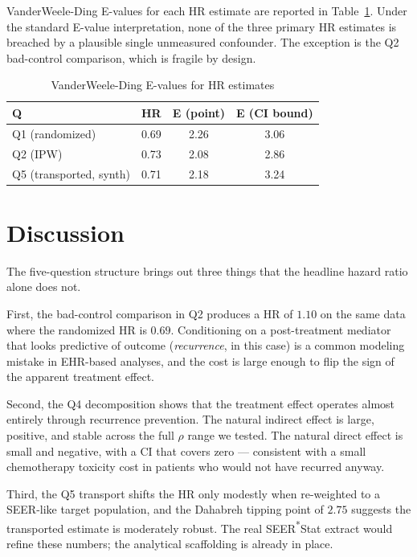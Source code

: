 \documentclass[conference]{IEEEtran}
\begin{document}
VanderWeele-Ding E-values \cite{vanderweele2017} for each HR estimate are reported in Table~\ref{tab:evalues}. Under the standard E-value interpretation, none of the three primary HR estimates is breached by a plausible single unmeasured confounder. The exception is the Q2 bad-control comparison, which is fragile by design.

\begin{table}[h]
\caption{VanderWeele-Ding E-values for HR estimates}
\label{tab:evalues}
\centering
\renewcommand{\arraystretch}{1.15}
\begin{tabular}{@{}lccc@{}}
\toprule
\textbf{Q} & \textbf{HR} & \textbf{E (point)} & \textbf{E (CI bound)} \\
\midrule
Q1 (randomized)            & 0.69 & 2.26 & 3.06 \\
Q2 (IPW)                   & 0.73 & 2.08 & 2.86 \\
Q5 (transported, synth)    & 0.71 & 2.18 & 3.24 \\
\bottomrule
\end{tabular}
\end{table}

\section{Discussion}

The five-question structure brings out three things that the headline hazard ratio alone does not.

First, the bad-control comparison in Q2 produces a HR of $1.10$ on the same data where the randomized HR is $0.69$. Conditioning on a post-treatment mediator that looks predictive of outcome (\emph{recurrence}, in this case) is a common modeling mistake in EHR-based analyses, and the cost is large enough to flip the sign of the apparent treatment effect.

Second, the Q4 decomposition shows that the treatment effect operates almost entirely through recurrence prevention. The natural indirect effect is large, positive, and stable across the full $\rho$ range we tested. The natural direct effect is small and negative, with a CI that covers zero --- consistent with a small chemotherapy toxicity cost in patients who would not have recurred anyway.

Third, the Q5 transport shifts the HR only modestly when re-weighted to a SEER-like target population, and the Dahabreh tipping point of $2.75$ suggests the transported estimate is moderately robust. The real SEER\textsuperscript{*}Stat extract would refine these numbers; the analytical scaffolding is already in place.
\end{document}
